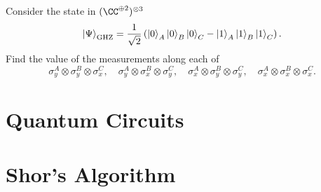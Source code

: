\documentclass[11pt]{scrreprt}
\begin{document}
\begin{problem}
	Consider the state in $(\CC^{\oplus2})^{\otimes 3}$
	\[
		\ket{\Psi}_{\text{GHZ}}
		=
		\frac{1}{\sqrt2}
		\left( 
		\ket0_A \ket0_B \ket0_C
		- \ket1_A \ket1_B \ket1_C \right).
	\]
	Find the value of the measurements along each of
	\[ \sigma_y^A \otimes \sigma_y^B \otimes \sigma_x^C , \quad
		\sigma_y^A \otimes \sigma_x^B \otimes \sigma_y^C, \quad
		\sigma_x^A \otimes \sigma_y^B \otimes \sigma_y^C, \quad
		\sigma_x^A \otimes \sigma_x^B \otimes \sigma_x^C.
	\]
\end{problem}

\chapter{Quantum Circuits}
\chapter{Shor's Algorithm}
\end{document}
